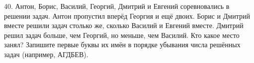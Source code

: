40. Антон, Борис, Василий, Георгий, Дмитрий и Евгений соревновались в решении задач. Антон пропустил вперёд Георгия и ещё двоих. Борис и Дмитрий вместе решили задач столько же, сколько Василий и Евгений вместе. Дмитрий решил задач больше, чем Георгий, но меньше, чем Василий. Кто какое место занял? Запишите первые буквы их имён в порядке убывания числа решённых задач (например, АГДБЕВ).\\
